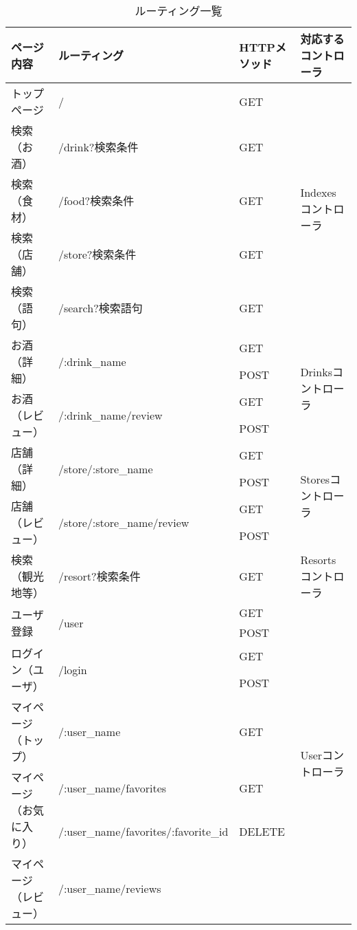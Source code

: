 \documentclass[a4j,titlepage]{jarticle}
\begin{document}
\begin{description}
\begin{table}[!htbp]
\caption{ルーティング一覧}
\label{routing}
\small
\begin{center}
\begin{tabular}{|l|l|l|p{4cm}|}\hline
ページ内容 & ルーティング & HTTPメソッド & 対応するコントローラ\\\hline\hline
トップページ & / & GET & \multirow{5}{*}{Indexesコントローラ} \\\cline{1-3}
検索（お酒） & /drink?検索条件 & GET & \\\cline{1-3}
検索（食材） & /food?検索条件 & GET & \\\cline{1-3}
検索（店舗） & /store?検索条件 & GET &  \\\cline{1-3}
検索（語句） & /search?検索語句 & GET & \\\hline
\multirow{2}{*}{お酒（詳細）} & \multirow{2}{*}{/:drink\_name}
& GET & \multirow{4}{*}{Drinksコントローラ} \\\cline{3-3}
 & & POST &  \\\cline{1-3}
\multirow{2}{*}{お酒（レビュー）} & \multirow{2}{*}{/:drink\_name/review}
& GET & \\\cline{3-3}
 & & POST & \\\hline
\multirow{2}{*}{店舗（詳細）} & \multirow{2}{*}{/store/:store\_name}
& GET & \multirow{4}{*}{Storesコントローラ} \\\cline{3-3}
 & & POST &  \\\cline{1-3}
\multirow{2}{*}{店舗（レビュー）}& \multirow{2}{*}{/store/:store\_name/review}
& GET &  \\\cline{3-3}
 & & POST &\\\hline
検索（観光地等） & /resort?検索条件 & GET & Resortsコントローラ \\\hline
\multirow{2}{*}{ユーザ登録} & \multirow{2}{*}{/user}
& GET & \multirow{12}{*}{Userコントローラ} \\\cline{3-3}
 & & POST & \\\cline{1-3}
 \multirow{2}{*}{ログイン（ユーザ）} & \multirow{2}{*}{/login}
 & GET & \\\cline{3-3}
 & & POST & \\\cline{1-3}
マイページ（トップ） & /:user\_name
& GET & \\\cline{1-3}
\multirow{2}{*}{マイページ（お気に入り）} & /:user\_name/favorites
& GET & \\\cline{2-3}
 & /:user\_name/favorites/:favorite\_id & DELETE & \\\cline{1-3}
\multirow{2}{*}{マイページ（レビュー）} & /:user\_name/reviews

\end{tabular}
\end{center}
\end{table}
\end{description}
\end{document}
